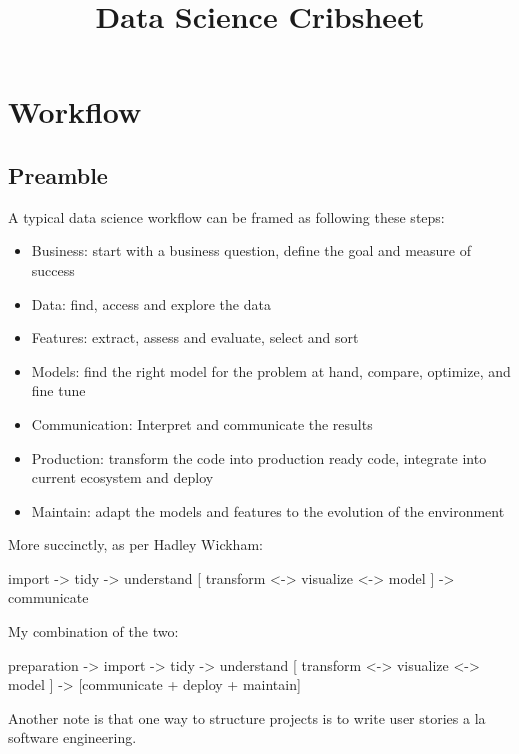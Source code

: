 \documentclass[]{book}
\title{Data Science Cribsheet}
\author{}
\date{}
\begin{document}
\maketitle

{
\setcounter{tocdepth}{1}
\tableofcontents
}
\chapter{Workflow}\label{workflow}

\section{Preamble}\label{preamble}

A typical data science workflow can be framed as following these steps:

\begin{itemize}
\item
  Business: start with a business question, define the goal and measure
  of success
\item
  Data: find, access and explore the data
\item
  Features: extract, assess and evaluate, select and sort
\item
  Models: find the right model for the problem at hand, compare,
  optimize, and fine tune
\item
  Communication: Interpret and communicate the results
\item
  Production: transform the code into production ready code, integrate
  into current ecosystem and deploy
\item
  Maintain: adapt the models and features to the evolution of the
  environment
\end{itemize}

More succinctly, as per Hadley Wickham:

import -\textgreater{} tidy -\textgreater{} understand {[} transform
\textless{}-\textgreater{} visualize \textless{}-\textgreater{} model
{]} -\textgreater{} communicate

My combination of the two:

preparation -\textgreater{} import -\textgreater{} tidy -\textgreater{}
understand {[} transform \textless{}-\textgreater{} visualize
\textless{}-\textgreater{} model {]} -\textgreater{} {[}communicate +
deploy + maintain{]}

Another note is that one way to structure projects is to write user
stories a la software engineering.
\end{document}
